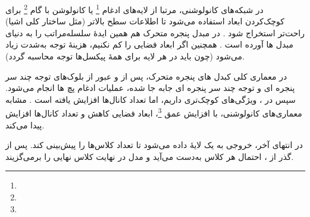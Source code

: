 در شبکه‌های کانولوشنی، مرتبا از لایه‌های ادغام \footnote{} یا کانولوشن با گام \footnote{} 
برای کوچک‌کردن ابعاد استفاده می‌شود تا اطلاعات سطح بالاتر (مثل ساختار کلی اشیا) راحت‌تر استخراج شود \cite{he2016deep}.  در مبدل پنجره متحرک هم همین ایدهٔ سلسله‌مراتب را به دنیای مبدل ها آورده است \cite{liu2021swintransformer}.  
همچنین اگر ابعاد فضایی را کم نکنیم، هزینهٔ توجه به‌شدت زیاد می‌شود 
(چون باید در هر لایه برای همهٔ پیکسل‌ها توجه محاسبه گردد).

در معماری کلی کبدل های پنجره متحرک، پس از  و عبور از بلوک‌های توجه چند سر پنجره ای و توجه چند سر پنجره ای جابه جا شده، عملیات  ادغام پچ ها انجام می‌شود. سپس در ، ویژگی‌های کوچک‌تری داریم، اما تعداد کانال‌ها افزایش یافته است \cite{liu2021swintransformer}.  
مشابه معماری‌های کانولوشنی، با افزایش عمق \footnote{}، ابعاد فضایی کاهش و تعداد کانال‌ها افزایش پیدا می‌کند.

در انتهای  آخر، خروجی به یک لایهٔ  داده می‌شود تا تعداد کلاس‌ها را پیش‌بینی کند.  
پس از گذر از ، احتمال هر کلاس به‌دست می‌آید و مدل در نهایت کلاس نهایی را برمی‌گزیند.






